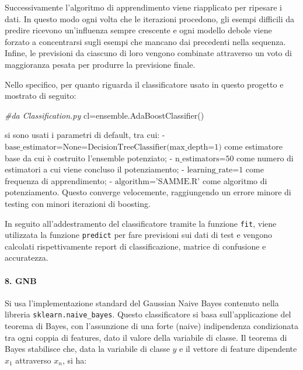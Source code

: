 \documentclass[11pt]{article}
\newenvironment{Shaded}{}{}
\newcommand{\CommentTok}[1]{\textcolor[rgb]{0.38,0.63,0.69}{\textit{{#1}}}}
\newcommand{\NormalTok}[1]{{#1}}
\newcommand{\OperatorTok}[1]{\textcolor[rgb]{0.40,0.40,0.40}{{#1}}}
\begin{document}
Successivamente l'algoritmo di apprendimento viene riapplicato per
ripesare i dati. In questo modo ogni volta che le iterazioni procedono,
gli esempi difficili da predire ricevono un'influenza sempre crescente e
ogni modello debole viene forzato a concentrarsi sugli esempi che
mancano dai precedenti nella sequenza. Infine, le previsioni da ciascuno
di loro vengono combinate attraverso un voto di maggioranza pesata per
produrre la previsione finale.

Nello specifico, per quanto riguarda il classificatore usato in questo
progetto e mostrato di seguito:

\begin{Shaded}
\begin{Highlighting}[]
\CommentTok{#da Classification.py}
\NormalTok{cl}\OperatorTok{=}\NormalTok{ensemble.AdaBoostClassifier()       }
\end{Highlighting}
\end{Shaded}

si sono usati i parametri di default, tra cui: -
\(\text{base_estimator=None=DecisionTreeClassifier(max_depth=1)}\) come
estimatore base da cui è costruito l'ensemble potenziato; -
\(\text{n_estimators=50}\) come numero di estimatori a cui viene
concluso il potenziamento; - \(\text{learning_rate=1}\) come frequenza
di apprendimento; - \(\text{algorithm='SAMME.R'}\) come algoritmo di
potenziamento. Questo converge velocemente, raggiungendo un errore
minore di testing con minori iterazioni di boosting.

In seguito all'addestramento del classificatore tramite la funzione
\texttt{fit}, viene utilizzata la funzione \texttt{predict} per fare
previsioni sui dati di test e vengono calcolati rispettivamente report
di classificazione, matrice di confusione e accuratezza.

    \paragraph{8. GNB}\label{gnb}

    Si usa l'implementazione standard del Gaussian Naive Bayes contenuto
nella libreria \texttt{sklearn.naive\_bayes}. Questo classificatore si
basa sull'applicazione del teorema di Bayes, con l'assunzione di una
forte (naive) indipendenza condizionata tra ogni coppia di features,
dato il valore della variabile di classe. Il teorema di Bayes stabilisce
che, data la variabile di classe \(y\) e il vettore di feature
dipendente \(x_1\) attraverso \(x_n\), si ha:
\end{document}
